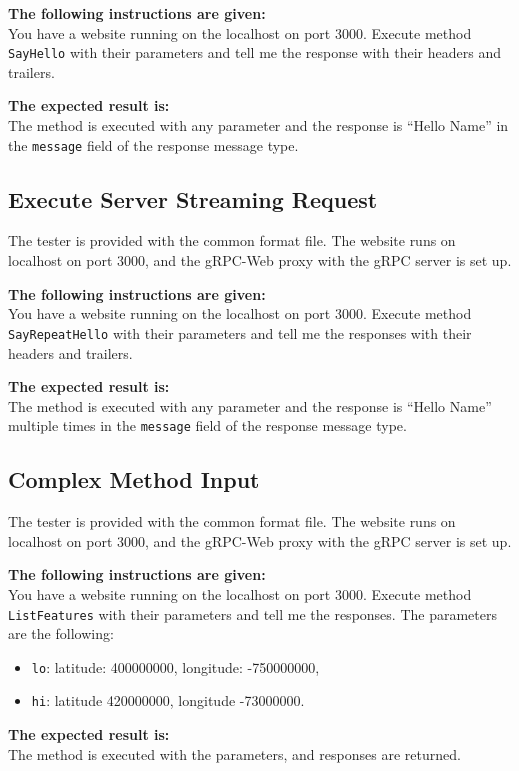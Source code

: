 \textbf{The following instructions are given:}\\
You have a website running on the localhost on port 3000.
Execute method \texttt{SayHello} with their parameters and tell me the response with their headers and trailers.

\textbf{The expected result is:}\\
The method is executed with any parameter
and the response is \enquote{Hello Name} in the \texttt{message} field of the response message type.

\subsection{Execute Server Streaming Request}
The tester is provided with the common format file.
The website runs on localhost on port 3000, and the gRPC-Web proxy with the gRPC server is set up.

\textbf{The following instructions are given:}\\
You have a website running on the localhost on port 3000.
Execute method \texttt{SayRepeatHello} with their parameters and tell me the responses with their headers and trailers.

\textbf{The expected result is:}\\
The method is executed with any parameter
and the response is \enquote{Hello Name} multiple times in the \texttt{message} field of the response message type.

\subsection{Complex Method Input}
The tester is provided with the common format file.
The website runs on localhost on port 3000, and the gRPC-Web proxy with the gRPC server is set up.

\textbf{The following instructions are given:}\\
You have a website running on the localhost on port 3000.
Execute method \texttt{ListFeatures} with their parameters and tell me the responses.
The parameters are the following:
\begin{itemize}
    \item \texttt{lo}: latitude: 400000000, longitude: -750000000,
    \item \texttt{hi}: latitude 420000000, longitude -73000000.
\end{itemize}

\textbf{The expected result is:}\\
The method is executed with the parameters, and responses are returned.

